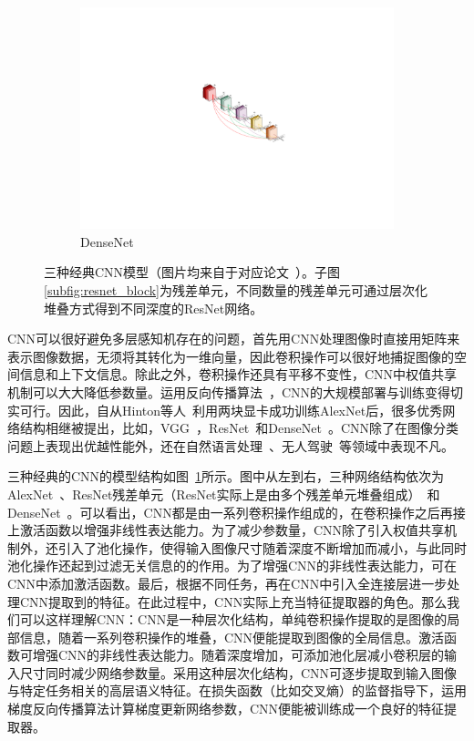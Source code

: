 \begin{figure}[h!]
\begin{subfigure}{0.265\textwidth}
		\includegraphics[width=1.0\textwidth]{figure/popular_networks_densenet}
		\caption{DenseNet~\cite{huang2017densely}}
	\end{subfigure}
	\caption[三种经典CNN模型]{三种经典CNN模型（图片均来自于对应论文~\cite{krizhevsky2012imagenet, he2016deep, huang2017densely}）。子图\ref{subfig:resnet_block}为残差单元，不同数量的残差单元可通过层次化堆叠方式得到不同深度的ResNet网络。}
	\label{mulfig:popular_networks}
\end{figure}

CNN可以很好避免多层感知机存在的问题，首先用CNN处理图像时直接用矩阵来表示图像数据，无须将其转化为一维向量，因此卷积操作可以很好地捕捉图像的空间信息和上下文信息。除此之外，卷积操作还具有平移不变性，CNN中权值共享机制可以大大降低参数量。运用反向传播算法~\cite{hecht1992theory}，CNN的大规模部署与训练变得切实可行。因此，自从Hinton等人~\cite{krizhevsky2012imagenet}利用两块显卡成功训练AlexNet后，很多优秀网络结构相继被提出，比如，VGG~\cite{simonyan2014very}，ResNet~\cite{he2016deep, he2016identity}和DenseNet~\cite{huang2017densely}。CNN除了在图像分类问题上表现出优越性能外，还在自然语言处理~\cite{dos2014deep, mou2016Convolutional}、无人驾驶~\cite{lee2017deep}等领域中表现不凡。

三种经典的CNN的模型结构如图~\ref{mulfig:popular_networks}所示。图中从左到右，三种网络结构依次为AlexNet~\cite{krizhevsky2012imagenet}、ResNet残差单元（ResNet实际上是由多个残差单元堆叠组成）~\cite{he2016deep, he2016identity}和DenseNet~\cite{huang2017densely}。可以看出，CNN都是由一系列卷积操作组成的，在卷积操作之后再接上激活函数以增强非线性表达能力。为了减少参数量，CNN除了引入权值共享机制外，还引入了池化操作，使得输入图像尺寸随着深度不断增加而减小，与此同时池化操作还起到过滤无关信息的的作用。为了增强CNN的非线性表达能力，可在CNN中添加激活函数。最后，根据不同任务，再在CNN中引入全连接层进一步处理CNN提取到的特征。在此过程中，CNN实际上充当特征提取器的角色。那么我们可以这样理解CNN：CNN是一种层次化结构，单纯卷积操作提取的是图像的局部信息，随着一系列卷积操作的堆叠，CNN便能提取到图像的全局信息。激活函数可增强CNN的非线性表达能力。随着深度增加，可添加池化层减小卷积层的输入尺寸同时减少网络参数量。采用这种层次化结构，CNN可逐步提取到输入图像与特定任务相关的高层语义特征。在损失函数（比如交叉熵）的监督指导下，运用梯度反向传播算法计算梯度更新网络参数，CNN便能被训练成一个良好的特征提取器。
